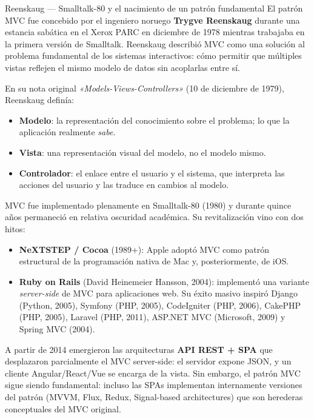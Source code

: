 \documentclass[11pt,a4paper,openany]{book}
\begin{document}
\begin{cajahistoria}{Reenskaug --- Smalltalk-80 y el nacimiento de un patrón fundamental}
El patrón MVC fue concebido por el ingeniero noruego \textbf{Trygve
Reenskaug} durante una estancia sabática en el Xerox PARC en
diciembre de 1978 mientras trabajaba en la primera versión de
Smalltalk. Reenskaug describió MVC como una solución al problema
fundamental de los sistemas interactivos: cómo permitir que múltiples
vistas reflejen el mismo modelo de datos sin acoplarlas entre sí.

En su nota original \emph{«Models-Views-Controllers»} (10 de
diciembre de 1979), Reenskaug definía:

\begin{itemize}
\item \textbf{Modelo}: la representación del conocimiento sobre el
problema; lo que la aplicación realmente \emph{sabe}.
\item \textbf{Vista}: una representación visual del modelo, no el
modelo mismo.
\item \textbf{Controlador}: el enlace entre el usuario y el sistema,
que interpreta las acciones del usuario y las traduce en cambios al
modelo.
\end{itemize}

MVC fue implementado plenamente en Smalltalk-80 (1980) y durante
quince años permaneció en relativa oscuridad académica. Su
revitalización vino con dos hitos:

\begin{itemize}
\item \textbf{NeXTSTEP / Cocoa} (1989+): Apple adoptó MVC como
patrón estructural de la programación nativa de Mac y, posteriormente,
de iOS.
\item \textbf{Ruby on Rails} (David Heinemeier Hansson, 2004):
implementó una variante \emph{server-side} de MVC para aplicaciones
web. Su éxito masivo inspiró Django (Python, 2005), Symfony
(PHP, 2005), CodeIgniter (PHP, 2006), CakePHP (PHP, 2005), Laravel
(PHP, 2011), ASP.NET MVC (Microsoft, 2009) y Spring MVC (2004).
\end{itemize}

A partir de 2014 emergieron las arquitecturas \textbf{API REST + SPA}
que desplazaron parcialmente el MVC server-side: el servidor expone
JSON, y un cliente Angular/React/Vue se encarga de la vista. Sin
embargo, el patrón MVC sigue siendo fundamental: incluso las SPAs
implementan internamente versiones del patrón (MVVM, Flux, Redux,
Signal-based architectures) que son herederas conceptuales del MVC
original.
\end{cajahistoria}
\end{document}
